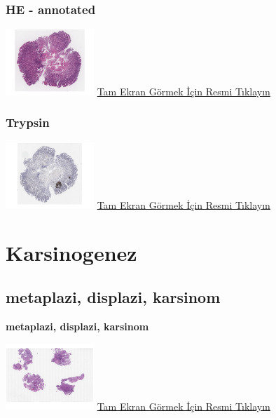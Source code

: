 \documentclass[
  letterpaper,
  DIV=11,
  numbers=noendperiod]{scrreprt}
\begin{document}
\hypertarget{he---annotated}{%
\subsection{HE - annotated}\label{he---annotated}}

\href{https://images.patolojiatlasi.com/metaplasia/HE_annotated.html}{\includegraphics[width=0.25\textwidth,height=\textheight]{./screenshots/metaplasia_screenshot.png}}
\href{https://images.patolojiatlasi.com/metaplasia/HE_annotated.html}{Tam
Ekran Görmek İçin Resmi Tıklayın}

\hypertarget{trypsin}{%
\subsection{Trypsin}\label{trypsin}}

\href{https://images.patolojiatlasi.com/metaplasia/trypsin.html}{\includegraphics[width=0.25\textwidth,height=\textheight]{./screenshots/metaplasia-trypsin_screenshot.png}}
\href{https://images.patolojiatlasi.com/metaplasia/trypsin.html}{Tam
Ekran Görmek İçin Resmi Tıklayın}

\hypertarget{sec-karsinogenez}{%
\chapter{Karsinogenez}\label{sec-karsinogenez}}

\hypertarget{sec-mepaplazi-displazi-karsinom}{%
\section{metaplazi, displazi,
karsinom}\label{sec-mepaplazi-displazi-karsinom}}

\textbf{metaplazi, displazi, karsinom}

\href{https://images.patolojiatlasi.com/carcinogenesis/HE.html}{\includegraphics[width=0.25\textwidth,height=\textheight]{./screenshots/carcinogenesis_screenshot.png}}
\href{https://images.patolojiatlasi.com/carcinogenesis/HE.html}{Tam
Ekran Görmek İçin Resmi Tıklayın}
\end{document}
